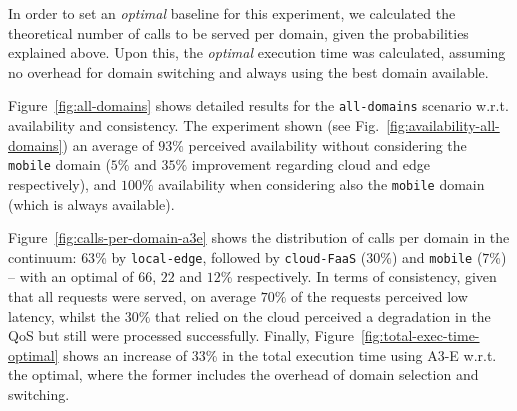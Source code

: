 


In order to set an \emph{optimal} baseline for this experiment, we calculated the theoretical number of calls to be served per domain, given the probabilities explained above. Upon this, the \emph{optimal} execution time was calculated, assuming no overhead for domain switching and always using the best domain available.

Figure~\ref{fig:all-domains} shows detailed results for the \texttt{all-domains} scenario w.r.t. availability and consistency. The experiment shown (see Fig.~\ref{fig:availability-all-domains}) an average of $93\%$ perceived availability without considering the \texttt{mobile} domain ($5\%$ and $35\%$ improvement regarding cloud and edge respectively), and $100\%$ availability when considering also the \texttt{mobile} domain (which is always available). 

Figure~\ref{fig:calls-per-domain-a3e} shows the distribution of calls per domain in the continuum: $63$\% by \texttt{local-edge}, followed by \texttt{cloud-FaaS} ($30$\%) and \texttt{mobile} ($7$\%) -- with an optimal of $66$, $22$ and $12$\% respectively. In terms of consistency, given that all requests were served, on average $70\%$ of the requests perceived low latency, whilst the $30\%$ that relied on the cloud perceived a degradation in the QoS but still were processed successfully. Finally, Figure~\ref{fig:total-exec-time-optimal} shows an increase of $33$\% in the total execution time using A3-E w.r.t. the optimal, where the former includes the overhead of domain selection and switching.
 
